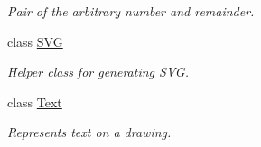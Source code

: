 \begin{DoxyCompactItemize}
\begin{DoxyCompactList}\small\item\em Pair of the arbitrary number and remainder. \end{DoxyCompactList}\item 
class \hyperlink{classcom_1_1aarrelaakso_1_1drawl_1_1_s_v_g}{S\+VG}
\begin{DoxyCompactList}\small\item\em Helper class for generating \hyperlink{classcom_1_1aarrelaakso_1_1drawl_1_1_s_v_g}{S\+VG}. \end{DoxyCompactList}\item 
class \hyperlink{classcom_1_1aarrelaakso_1_1drawl_1_1_text}{Text}
\begin{DoxyCompactList}\small\item\em Represents text on a drawing. \end{DoxyCompactList}\end{DoxyCompactItemize}
